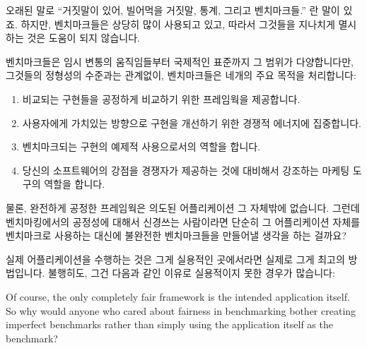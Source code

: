 오래된 말로 ``거짓말이 있어, 빌어먹을 거짓말, 통계, 그리고 벤치마크들.'' 란
말이 있죠.
하지만, 벤치마크들은 상당히 많이 사용되고 있고, 따라서 그것들을 지나치게
멸시하는 것은 도움이 되지 않습니다.

벤치마크들은 임시 변통의 움직임들부터 국제적인 표준까지 그 범위가 다양합니다만,
그것들의 정형성의 수준과는 관계없이, 벤치마크들은 네개의 주요 목적을
처리합니다:

\begin{enumerate}
\item	비교되는 구현들을 공정하게 비교하기 위한 프레임웍을 제공합니다.
\item	사용자에게 가치있는 방향으로 구현을 개선하기 위한 경쟁적 에너지에
	집중합니다.
\item	벤치마크되는 구현의 예제적 사용으로서의 역할을 합니다.
\item	당신의 소프트웨어의 강점을 경쟁자가 제공하는 것에 대비해서 강조하는
	마케팅 도구의 역할을 합니다.

\end{enumerate}

물론, 완전하게 공정한 프레임웍은 의도된 어플리케이션 그 자체밖에 없습니다.
그런데 벤치마킹에서의 공정성에 대해서 신경쓰는 사람이라면 단순히 그
어플리케이션 자체를 벤치마크로 사용하는 대신에 불완전한 벤치마크들을 만들어낼
생각을 하는 걸까요?

실제 어플리케이션을 수행하는 것은 그게 실용적인 곳에서라면 실제로 그게 최고의
방법입니다.
불행히도, 그건 다음과 같인 이유로 실용적이지 못한 경우가 많습니다:
\iffalse

Of course,  the only completely fair framework is the intended
application itself.
So why would anyone who cared about fairness in benchmarking
bother creating imperfect benchmarks rather than simply
using the application itself as the benchmark?


